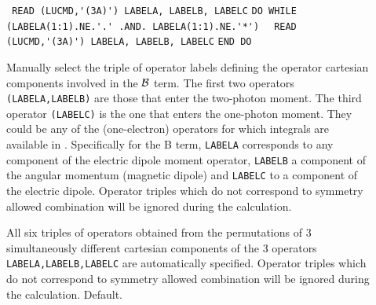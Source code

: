 \begin{description}
\item[] \verb| |\newline
\verb|READ (LUCMD,'(3A)') LABELA, LABELB, LABELC|\newline
\verb|DO WHILE (LABELA(1:1).NE.'.' .AND. LABELA(1:1).NE.'*')|\newline
\verb|  READ (LUCMD,'(3A)') LABELA, LABELB, LABELC|\newline
\verb|END DO|
%

Manually select the triple of operator labels defining the operator
cartesian components involved in the ${\cal B}$ term. 
The first two operators \verb+(LABELA,LABELB)+
are those that enter the two-photon moment.
The third operator \verb+(LABELC)+ 
is the one that enters the one-photon 
moment. They could be any of the (one-electron)
operators for which integrals are available in 
.
Specifically for the B term, \verb+LABELA+
corresponds to any component of the electric dipole 
moment operator, \verb+LABELB+ a component of the
angular momentum (magnetic dipole) and
\verb+LABELC+ to a component of the electric dipole.
Operator triples which do not correspond to symmetry allowed
combination will be ignored during the calculation.

%
\item[] 
All six triples of operators obtained from the
permutations of 3 simultaneously different 
cartesian components of the 3 operators 
\verb+LABELA,LABELB,LABELC+ are automatically specified.
Operator triples which do not correspond to symmetry allowed
combination will be ignored during the calculation.
Default.


\end{description}

